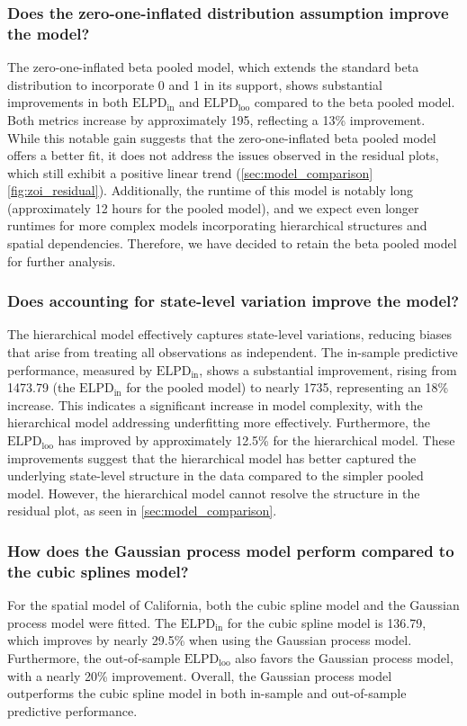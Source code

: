 \documentclass[12pt]{article}
\begin{document}
\subsubsection{Does the zero-one-inflated distribution assumption improve the model?}
The zero-one-inflated beta pooled model, which extends the standard beta distribution to incorporate 0 and 1 in its support, shows substantial improvements in both $\text{ELPD}_{\text{in}}$ and $\text{ELPD}_{\text{loo}}$ compared to the beta pooled model. Both metrics increase by approximately 195, reflecting a 13\% improvement. While this notable gain suggests that the zero-one-inflated beta pooled model offers a better fit, it does not address the issues observed in the residual plots, which still exhibit a positive linear trend (\autoref{sec:model_comparison}\autoref{fig:zoi_residual}). Additionally, the runtime of this model is notably long (approximately 12 hours for the pooled model), and we expect even longer runtimes for more complex models incorporating hierarchical structures and spatial dependencies. Therefore, we have decided to retain the beta pooled model for further analysis.

\subsubsection{Does accounting for state-level variation improve the model?}
The hierarchical model effectively captures state-level variations, reducing biases that arise from treating all observations as independent. The in-sample predictive performance, measured by $\text{ELPD}_{\text{in}}$, shows a substantial improvement, rising from 1473.79 (the $\text{ELPD}_{\text{in}}$ for the pooled model) to nearly 1735, representing an 18\% increase. This indicates a significant increase in model complexity, with the hierarchical model addressing underfitting more effectively. Furthermore, the $\text{ELPD}_{\text{loo}}$ has improved by approximately 12.5\% for the hierarchical model. These improvements suggest that the hierarchical model has better captured the underlying state-level structure in the data compared to the simpler pooled model. However, the hierarchical model cannot resolve the structure in the residual plot, as seen in \autoref{sec:model_comparison}.

\subsubsection{How does the Gaussian process model perform compared to the cubic splines model?}
For the spatial model of California, both the cubic spline model and the Gaussian process model were fitted. The $\text{ELPD}_{\text{in}}$ for the cubic spline model is 136.79, which improves by nearly 29.5\% when using the Gaussian process model. Furthermore, the out-of-sample $\text{ELPD}_{\text{loo}}$ also favors the Gaussian process model, with a nearly 20\% improvement. Overall, the Gaussian process model outperforms the cubic spline model in both in-sample and out-of-sample predictive performance.
\end{document}
